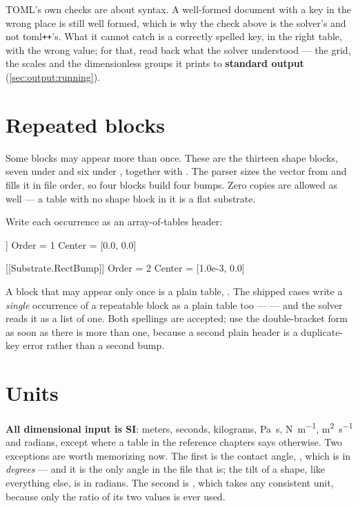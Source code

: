 TOML's own checks are about syntax. A well-formed document with a key in the
wrong place is still well formed, which is why the check above is the solver's
and not toml\texttt{++}'s. What it cannot catch is a correctly spelled key, in
the right table, with the wrong value; for that, read back what the solver
understood --- the grid, the scales and the dimensionless groups it prints to
\textbf{standard output} (\cref{sec:output:running}).

\section{Repeated blocks}
\label{sec:inputformat:repeat}

Some blocks may appear more than once. These are the thirteen shape blocks,
seven under  and six under , together
with . The parser sizes the vector from
 and fills it in file order, so four 
blocks build four bumps. Zero copies are allowed as well --- a
 table with no shape block in it is a flat substrate.

Write each occurrence as an array-of-tables header:

\begin{toml}
[[Substrate.RectBump]]
Order  = 1
Center = [0.0, 0.0]

[[Substrate.RectBump]]
Order  = 2
Center = [1.0e-3, 0.0]
\end{toml}

A block that may appear only once is a plain table, \code{[Substrate]}. The
shipped cases write a \emph{single} occurrence of a repeatable block as a plain
table too ---  --- and the solver reads it as a
list of one. Both spellings are accepted; use the double-bracket form as soon
as there is more than one, because a second plain 
header is a duplicate-key error rather than a second bump.

\section{Units}
\label{sec:inputformat:units}

\textbf{All dimensional input is SI}: meters, seconds, kilograms, \si{\pascal\second},
\si{\newton\per\metre}, \si{\metre\squared\per\second} and radians, except
where a table in the reference chapters says otherwise. Two exceptions are
worth memorizing now. The first is the contact angle,
,
which is in \emph{degrees} --- and it is the only angle in the file that is;
the tilt of a  shape, like everything else, is in radians. The
second is , which takes any consistent unit, because only
the ratio of its two values is ever used.

